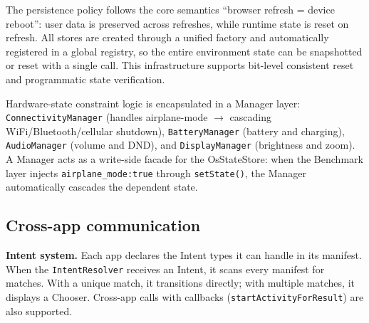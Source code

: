 \begin{table}[!htbp]
  \centering\small
  \setlength{\tabcolsep}{3pt}
  \caption{Android data model $\to$ \sys{} state-layer mapping}
  \label{tab:android-layers}
\end{table}

The persistence policy follows the core semantics ``browser refresh = device reboot'': user data is preserved across refreshes, while runtime state is reset on refresh. All stores are created through a unified factory and automatically registered in a global registry, so the entire environment state can be snapshotted or reset with a single call. This infrastructure supports bit-level consistent reset and programmatic state verification.

Hardware-state constraint logic is encapsulated in a Manager layer: \texttt{ConnectivityManager} (handles airplane-mode $\to$ cascading WiFi/Bluetooth/cellular shutdown), \texttt{BatteryManager} (battery and charging), \texttt{AudioManager} (volume and DND), and \texttt{DisplayManager} (brightness and zoom). A Manager acts as a write-side facade for the OsStateStore: when the Benchmark layer injects \texttt{airplane\_mode:true} through \texttt{setState()}, the Manager automatically cascades the dependent state.

\subsection{Cross-app communication}

\textbf{Intent system.} Each app declares the Intent types it can handle in its manifest. When the \texttt{IntentResolver} receives an Intent, it scans every manifest for matches. With a unique match, it transitions directly; with multiple matches, it displays a Chooser. Cross-app calls with callbacks (\texttt{startActivityForResult}) are also supported.

